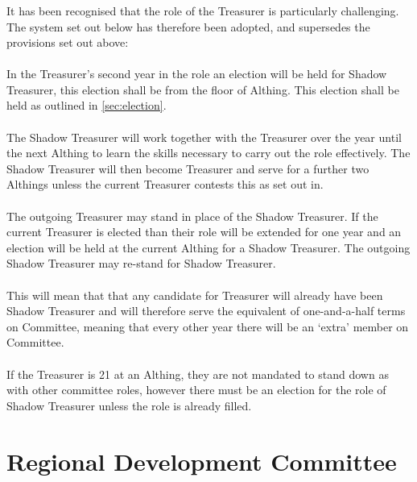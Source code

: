 \documentclass[a4paper, 12pt]{article}
\begin{document}
\subsubsection{}
It has been recognised that the role of the Treasurer is particularly challenging. The system set out below has therefore been adopted, and supersedes the provisions set out above:
\paragraph{}
In the Treasurer's second year in the role an election will be held for Shadow Treasurer, this election shall be from the floor of Althing. This election shall be held as outlined in \ref{sec:election}.
\paragraph{}
The Shadow Treasurer will work together with the Treasurer over the year until the next Althing to learn the skills necessary to carry out the role effectively. The Shadow Treasurer will then become Treasurer and serve for a further two Althings unless the current Treasurer contests this as set out in.
\paragraph{}
The outgoing Treasurer may stand in place of the Shadow Treasurer. If the current Treasurer is elected than their role will be extended for one year and an election will be held at the current Althing for a Shadow Treasurer. The outgoing Shadow Treasurer may re-stand for Shadow Treasurer.
\paragraph{}
This will mean that that any candidate for Treasurer will already have been Shadow Treasurer and will therefore serve the equivalent of one-and-a-half terms on Committee, meaning that every other year there will be an `extra' member on Committee.
\paragraph{}
\label{sec:treasurergreyarea}
If the Treasurer is 21 at an Althing, they are not mandated to stand down as with other committee roles, however there must be an election for the role of Shadow Treasurer unless the role is already filled.

\section{Regional Development Committee}
\end{document}
